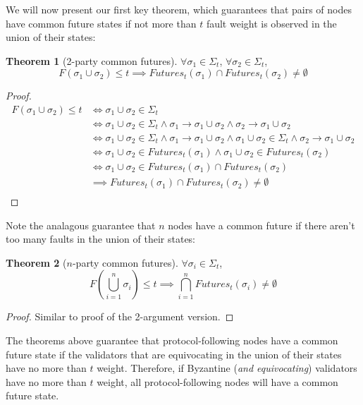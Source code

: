 \documentclass{article}
\theoremstyle{definition}
\newtheorem{thm}{Theorem}
\begin{document}
We will now present our first key theorem, which guarantees that pairs of nodes have common future states if not more than $t$ fault weight is observed in the union of their states:

\begin{thm}[2-party common futures]
$\forall \sigma_1 \in \Sigma_t$, $\forall \sigma_2 \in \Sigma_t$,
$$
F(\sigma_1 \cup \sigma_2) \leq t \implies Futures_t(\sigma_1) \cap Futures_t(\sigma_2) \neq \emptyset
$$
\end{thm}

\begin{proof}
\begin{align}
F(\sigma_1 \cup \sigma_2) \leq t &\iff \sigma_1 \cup \sigma_2 \in \Sigma_t \\
&\iff \sigma_1 \cup \sigma_2 \in \Sigma_t \land\sigma_1 \to \sigma_1 \cup \sigma_2 \land \sigma_2 \to \sigma_1 \cup \sigma_2 \\
&\iff \sigma_1 \cup \sigma_2 \in \Sigma_t  \land \sigma_1 \to \sigma_1  \cup \sigma_2 \land \sigma_1 \cup \sigma_2 \in \Sigma_t  \land \sigma_2 \to \sigma_1 \cup  \sigma_2 \\
&\iff \sigma_1 \cup \sigma_2 \in Futures_t(\sigma_1) \land \sigma_1 \cup \sigma_2 \in Futures_t(\sigma_2) \\
&\iff \sigma_1 \cup \sigma_2 \in Futures_t(\sigma_1) \cap Futures_t(\sigma_2) \\
&\implies Futures_t(\sigma_1) \cap Futures_t(\sigma_2) \neq \emptyset \\
\end{align}
\end{proof}

Note the analagous guarantee that $n$ nodes have a common future if there aren't too many faults in the union of their states:

\begin{thm}[$n$-party common futures]
\label{thm:nparty_bft_common_futures}
$\forall \sigma_i \in \Sigma_t$,
$$
F(\bigcup_{i=1}^n \sigma_i) \leq t \implies \bigcap_{i=1}^n Futures_t(\sigma_i) \neq \emptyset
$$
\end{thm}

\begin{proof}
Similar to proof of the 2-argument version.
\end{proof}

The theorems above guarantee that protocol-following nodes have a common future state if the validators that are equivocating in the union of their states have no more than $t$ weight. Therefore, if Byzantine (\emph{and equivocating}) validators have no more than $t$ weight, all protocol-following nodes will have a common future state.
\end{document}
